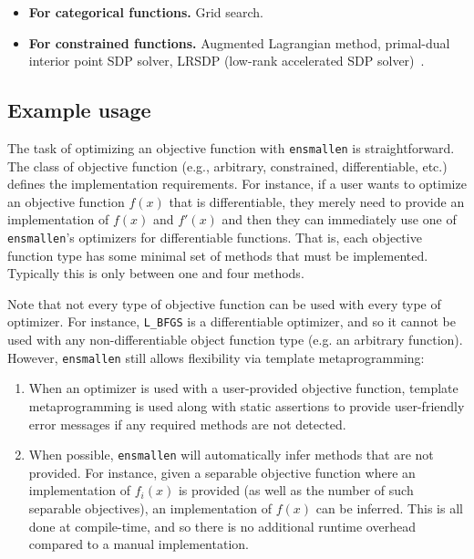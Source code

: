 \begin{itemize}
  \item {\bf For categorical functions.}  Grid search.

  \item {\bf For constrained functions.}  Augmented Lagrangian method,
primal-dual interior point SDP solver, LRSDP (low-rank accelerated SDP
solver)~\cite{burer2003nonlinear}.
\end{itemize}

\subsection{Example usage}
\label{sec:linreg_example}

The task of optimizing an objective function with {\tt ensmallen} is
straightforward.  The class of objective function (e.g., arbitrary, constrained,
differentiable, etc.) defines the implementation requirements.  For instance, if
a user wants to optimize an objective function $f(x)$ that is differentiable,
they merely need to provide an implementation of $f(x)$ and $f'(x)$ and then
they can immediately use one of {\tt ensmallen}'s optimizers for differentiable
functions.  That is, each objective function type has some minimal set of
methods that must be implemented.  Typically this is only between one and four
methods.

Note that not every type of objective function can be used with every type of
optimizer.  For instance, {\tt L\_BFGS} is a differentiable optimizer, and so it
cannot be used with any non-differentiable object function type (e.g. an
arbitrary function).  However, {\tt ensmallen} still allows flexibility
via template metaprogramming:

\begin{enumerate}
  \item When an optimizer is used with a user-provided objective function,
template metaprogramming is used along with static assertions to provide
user-friendly error messages if any required methods are not detected.

  \item When possible, {\tt ensmallen} will automatically infer methods that are
not provided.  For instance, given a separable objective function where an
implementation of $f_i(x)$ is provided (as well as the number of such separable
objectives), an implementation of $f(x)$ can be inferred.  This is all done at
compile-time, and so there is no additional runtime overhead compared to a
manual implementation.
\end{enumerate}

